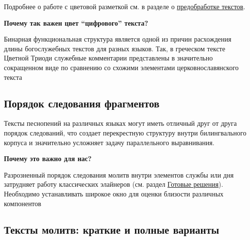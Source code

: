 \documentclass[
  letterpaper,
]{book}
\begin{document}
Подробнее о работе с цветовой разметкой см. в разделе о
\protect\hyperlink{sec-html_color}{предобработке текстов}.

\begin{tcolorbox}[enhanced jigsaw, rightrule=.15mm, breakable, colframe=quarto-callout-note-color-frame, colback=white, leftrule=.75mm, left=2mm, arc=.35mm, opacityback=0, toprule=.15mm, bottomrule=.15mm]

\textbf{Почему так важен цвет ``цифрового'' текста?}\vspace{2mm}

Бинарная функциональная структура является одной из причин расхождения
длины богослужебных текстов для разных языков. Так, в греческом тексте
Цветной Триоди служебные комментарии представлены в значительно
сокращенном виде по сравнению со схожими элементами церковнославянского
текста

\end{tcolorbox}

\hypertarget{sec-element_order}{%
\subsection{Порядок следования фрагментов}\label{sec-element_order}}

Тексты песнопений на различных языках могут иметь отличный друг от друга
порядок следований, что создает перекрестную структуру внутри
билингвального корпуса и значительно усложняет задачу параллельного
выравнивания.

\begin{tcolorbox}[enhanced jigsaw, rightrule=.15mm, breakable, colframe=quarto-callout-note-color-frame, colback=white, leftrule=.75mm, left=2mm, arc=.35mm, opacityback=0, toprule=.15mm, bottomrule=.15mm]

\textbf{Почему это важно для нас?}\vspace{2mm}

Разрозненный порядок следования молитв внутри элементов службы или дня
затрудняет работу классических элайнеров (см. раздел
\protect\hyperlink{sec-about_aligners}{Готовые решения}). Необходимо
устанавливать широкое окно для оценки близости различных компонентов

\end{tcolorbox}

\hypertarget{sec-full_or_abridged_hymns}{%
\subsection{Тексты молитв: краткие и полные
варианты}\label{sec-full_or_abridged_hymns}}
\end{document}
